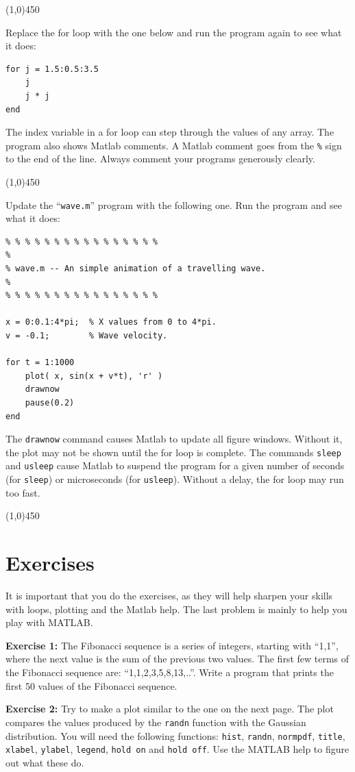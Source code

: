 \documentclass[12pt,a4paper]{article}   %
\newcommand{\code}[1]{\texttt{#1}}
\newcommand{\ruler}{
  \begin{center}
    \line(1,0){450}
  \end{center}
}
\begin{document}
\ruler

Replace the for loop with the one below and run the program again to see what it does:

\begin{verbatim}
for j = 1.5:0.5:3.5
    j
    j * j
end
\end{verbatim}

The index variable in a for loop can step through the values of any array. The program
also shows Matlab comments. A Matlab comment goes from the \code{\%} sign to the end of
the line. Always comment your programs generously clearly.


\ruler

Update the ``\code{wave.m}'' program with the following one. Run the program and see
what it does:

\begin{verbatim}
% % % % % % % % % % % % % % % %
% 
% wave.m -- An simple animation of a travelling wave.
% 
% % % % % % % % % % % % % % % %

x = 0:0.1:4*pi;  % X values from 0 to 4*pi.
v = -0.1;        % Wave velocity.

for t = 1:1000
    plot( x, sin(x + v*t), 'r' )
    drawnow
    pause(0.2)
end
\end{verbatim}


The \code{drawnow} command causes Matlab to update all figure windows. Without it, the
plot may not be shown until the for loop is complete. The commands \code{sleep} and
\code{usleep} cause Matlab to suspend the program for a given number of seconds (for
\code{sleep}) or microseconds (for \code{usleep}). Without a delay, the for loop may
run too fast.


\ruler

\section{Exercises}

It is important that you do the exercises, as they will help sharpen your skills with
loops, plotting and the Matlab help. The last problem is mainly to help you play with
MATLAB.

\textbf{Exercise 1:} The Fibonacci sequence is a series of integers, starting with ``1,1'', where
the next value is the sum of the previous two values. The first few terms of the Fibonacci
sequence are: ``1,1,2,3,5,8,13,..''. Write a program that prints the first 50 values of the
Fibonacci sequence.

\textbf{Exercise 2:} Try to make a plot similar to the one on the next page. The plot compares the values produced by the \texttt{randn} function with the Gaussian distribution. You will need the following functions: \texttt{hist}, \texttt{randn}, \texttt{normpdf}, \texttt{title}, \texttt{xlabel}, \texttt{ylabel}, \texttt{legend}, \texttt{hold on} and \texttt{hold off}. Use the MATLAB help to figure out what these do.
\end{document}
